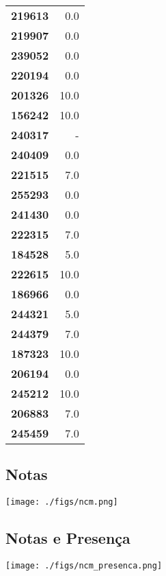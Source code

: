 \documentclass[11pt]{article}
\begin{document}
\begin{center}
\begin{longtable}{lr}
\textbf{219613} &                      0.0 \\
\textbf{219907} &                      0.0 \\
\textbf{239052} &                      0.0 \\
\textbf{220194} &                      0.0 \\
\textbf{201326} &                     10.0 \\
\textbf{156242} &                     10.0 \\
\textbf{240317} &                        - \\
\textbf{240409} &                      0.0 \\
\textbf{221515} &                      7.0 \\
\textbf{255293} &                      0.0 \\
\textbf{241430} &                      0.0 \\
\textbf{222315} &                      7.0 \\
\textbf{184528} &                      5.0 \\
\textbf{222615} &                     10.0 \\
\textbf{186966} &                      0.0 \\
\textbf{244321} &                      5.0 \\
\textbf{244379} &                      7.0 \\
\textbf{187323} &                     10.0 \\
\textbf{206194} &                      0.0 \\
\textbf{245212} &                     10.0 \\
\textbf{206883} &                      7.0 \\
\textbf{245459} &                      7.0 \\
\end{longtable}
\end{center}
\subsection{Notas}
\label{sec:orgae5c7b9}
\begin{center}
\texttt{[image: ./figs/ncm.png]}
\end{center}


\subsection{Notas e Presença}
\label{sec:org919447e}
\begin{center}
\texttt{[image: ./figs/ncm\_presenca.png]}
\end{center}
\end{document}
